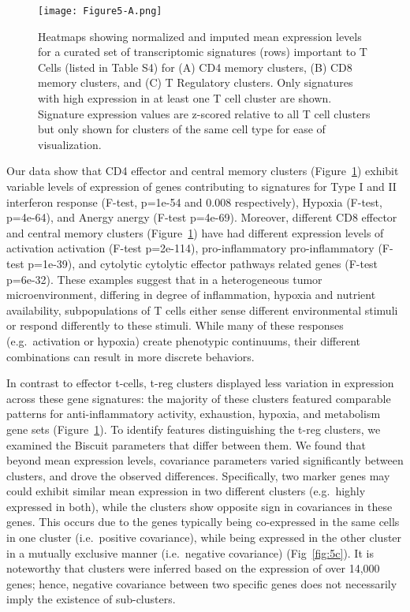 \begin{figure}
\centering
\texttt{[image: Figure5-A.png]}
\caption{Heatmaps showing normalized and imputed mean expression levels for a curated set of transcriptomic signatures (rows) important to T Cells (listed in Table S4) for (A) CD4 memory clusters, (B) CD8 memory clusters, and (C) T Regulatory clusters.
  Only signatures with high expression in at least one T cell cluster are shown.
  Signature expression values are z-scored relative to all T cell clusters but only shown for clusters of the same cell type for ease of visualization.
}
\label{fig:5a}
\end{figure}

Our data show that CD4 effector and central memory clusters (Figure~\ref{fig:5a}) exhibit variable levels of expression of genes contributing to signatures for Type I and II interferon response (F-test, p=1e-54 and 0.008 respectively), Hypoxia (F-test, p=4e-64), and Anergy anergy (F-test p=4e-69).
Moreover, different CD8 effector and central memory clusters (Figure~\ref{fig:5a}) have had different expression levels of activation activation (F-test p=2e-114), pro-inflammatory pro-inflammatory (F-test p=1e-39), and cytolytic cytolytic effector pathways related genes (F-test p=6e-32).
These examples suggest that in a heterogeneous tumor microenvironment, differing in degree of inflammation, hypoxia and nutrient availability, subpopulations of T cells either sense different environmental stimuli or respond differently to these stimuli.
While many of these responses (e.g.\ activation or hypoxia) create phenotypic continuums, their different combinations can result in more discrete behaviors.

In contrast to effector t-cells, t-reg clusters displayed less variation in expression across these gene signatures: the majority of these clusters featured comparable patterns for anti-inflammatory activity, exhaustion, hypoxia, and metabolism gene sets (Figure~\ref{fig:5a}).
To identify features distinguishing the t-reg clusters, we examined the Biscuit parameters that differ between them.
We found that beyond mean expression levels, covariance parameters varied significantly between clusters, and drove the observed differences.
Specifically, two marker genes may could exhibit similar mean expression in two different clusters (e.g.\ highly expressed in both), while the clusters show opposite sign in covariances in these genes.
This occurs due to the genes typically being co-expressed in the same cells in one cluster (i.e.\ positive covariance), while being expressed in the other cluster in a mutually exclusive manner (i.e.\ negative covariance) (Fig~\ref{fig:5c}).
It is noteworthy that clusters were inferred based on the expression of over 14,000 genes; hence, negative covariance between two specific genes does not necessarily imply the existence of sub-clusters.

